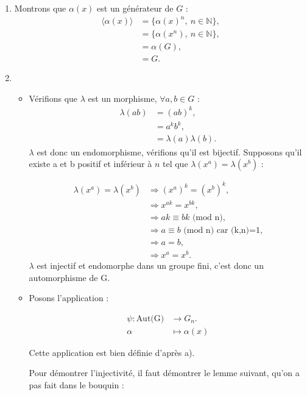 
\begin{enumerate}[label=\alph*)]
    \item Montrons que $\alpha(x)$ est un générateur de $G$ :  \begin{align*}
        \langle \alpha(x) \rangle &= \{\alpha(x)^n,\ n \in \mathbb{N}\}, \\
        &= \{\alpha(x^n),\ n \in \mathbb{N}\}, \\
        &= \alpha(G), \\
        &= G.
    \end{align*}
    \item 
    \begin{itemize}
        \item 
    
    Vérifions que $\lambda$ est un morphisme, $\forall a,b \in G$ :
    \begin{align*}
        \lambda(ab) &= (ab)^k,\\
        &= a^kb^k, \\
        &= \lambda(a)\lambda(b).
    \end{align*}
    $\lambda$ est donc un endomorphisme, vérifions qu'il est bijectif. Supposons qu'il existe a et b positif et inférieur à $n$ tel que $\lambda(x^a) = \lambda(x^b)$ : 

    \begin{align*}
        \lambda(x^a) = \lambda(x^b) &\Rightarrow (x^a)^k = (x^b)^k,\\
        &\Rightarrow x^{ak} = x^{bk},\\
        &\Rightarrow ak \equiv bk \text{ (mod n)},\\
        &\Rightarrow a \equiv b \text{ (mod n) car (k,n)=1,} \\
        &\Rightarrow a = b,\\
        &\Rightarrow x^a=x^b.
    \end{align*}
$\lambda$ est injectif et endomorphe dans un groupe fini, c'est donc un automorphisme de G.

\item Posons l'application :


\begin{align*}
\psi :  \text{Aut(G)} &\rightarrow G_n. \\
 \alpha &\mapsto \alpha(x)
\end{align*}

Cette application est bien définie d'après a).

Pour démontrer l'injectivité, il faut démontrer le lemme suivant, qu'on a pas fait dans le bouquin :


\end{itemize}
\end{enumerate}
